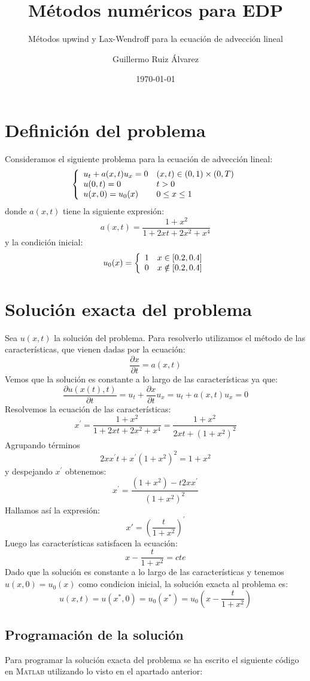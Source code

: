 \documentclass[spanish]{mathnotes}
\title{Métodos numéricos para EDP}
\subtitle{Métodos upwind y Lax-Wendroff para la ecuación de advección lineal}
\author{Guillermo Ruiz Álvarez}
\date{\today}
\begin{document}
	\makepre
	
	\section{Definición del problema}
	Consideramos el siguiente problema para la ecuación de advección lineal:
	\begin{equation*}
		\left\{
		\begin{array}{l l}
			u_t + a(x,t)u_x = 0 & (x,t) \in (0,1)\times(0,T)\\
			u(0,t) = 0 & t > 0\\
			u(x,0) = u_0(x) & 0\le x\le 1
		\end{array}
		\right.
	\end{equation*}
	donde $a(x,t)$ tiene la siguiente expresión:
	$$a(x,t) = \frac{1+x^2}{1+2xt+2x^2+x^4}$$
	y la condición inicial:
	\begin{equation*}
		u_0(x) = \left\{
		\begin{array}{l l}
		1 & x\in [0.2,0.4]\\
		0 & x\notin [0.2,0.4]
		\end{array}
		\right.
	\end{equation*}
	
	\section{Solución exacta del problema}
	Sea $u(x,t)$ la solución del problema. Para resolverlo utilizamos el método de las características, que vienen dadas por la ecuación:
	$$\frac{\partial x}{\partial t} = a(x,t)$$
	Vemos que la solución es constante a lo largo de las características ya que:
	$$\frac{\partial u(x(t), t)}{\partial t} = 
	u_t + \frac{\partial x}{\partial t}u_x = u_t + a(x,t)u_x = 0$$
	Resolvemos la ecuación de las características:	
	$$x^\prime = \frac{1+x^2}{1+2xt+2x^2+x^4} = \frac{1+x^2}{2xt+(1+x^2)^2}$$
	Agrupando términos
    $$2xx^\prime t+x^\prime(1+x^2)^2 = 1+x^2$$
    y despejando $x^\prime$ obtenemos:
	$$x^\prime = \frac{(1+x^2)-t2xx^\prime}{(1+x^2)^2}$$
	Hallamos así la expresión:
	$$x' = \left(\frac{t}{1+x^2}\right)^\prime$$
	Luego las características satisfacen la ecuación: 
	$$x - \frac{t}{1+x^2} = cte$$
	Dado que la solución es constante a lo largo de las características y tenemos $u(x,0) = u_0(x)$ como condicion inicial, la solución exacta al problema es:
	$$u(x,t) = u(x^*,0) = u_0(x^*) = u_0\left(x - \frac{t}{1+x^2}\right)$$
	\subsection{Programación de la solución}
	Para programar la solución exacta del problema se ha escrito el siguiente código en \textsc{Matlab} utilizando lo visto en el apartado anterior:
	\lstset{style=matlabStyle}
	
	
\end{document}
